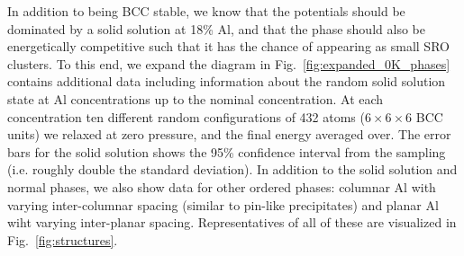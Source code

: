 In addition to being BCC stable, we know that the potentials should be dominated by a solid solution at 18\% Al, and that the \DOTHREE phase should also be energetically competitive such that it has the chance of appearing as small SRO clusters.
To this end, we expand the diagram in Fig.~\ref{fig:expanded_0K_phases} contains additional data including information about the random solid solution state at Al concentrations up to the nominal \DOTHREE concentration.
At each concentration ten different random configurations of 432 atoms ($6\times6\times6$ BCC units) we relaxed at zero pressure, and the final energy averaged over.
The error bars for the solid solution shows the 95\% confidence interval from the sampling (i.e. roughly double the standard deviation).
In addition to the solid solution and normal phases, we also show data for other ordered phases: columnar Al with varying inter-columnar spacing (similar to pin-like \BTWO precipitates) and planar Al wiht varying inter-planar spacing.
Representatives of all of these are visualized in Fig.~\ref{fig:structures}.
%
